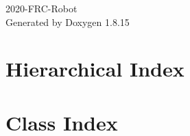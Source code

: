 \let\mypdfximage\pdfximage\def\pdfximage{\immediate\mypdfximage}\documentclass[twoside]{book}
\newcommand{\+}{\discretionary{\mbox{\scriptsize$\hookleftarrow$}}{}{}}
\newcommand{\clearemptydoublepage}{%
  \newpage{\pagestyle{empty}\cleardoublepage}%
}
\begin{document}
\hypersetup{pageanchor=false,
             bookmarksnumbered=true,
             pdfencoding=unicode
            }
\begin{titlepage}
\vspace*{7cm}
\begin{center}%
{\Large 2020-\/F\+R\+C-\/\+Robot }\\
\vspace*{1cm}
{\large Generated by Doxygen 1.8.15}\\
\end{center}
\end{titlepage}
\clearemptydoublepage
{}
\tableofcontents
\clearemptydoublepage
{}
\hypersetup{pageanchor=true}

\chapter{Hierarchical Index}

\chapter{Class Index}

\end{document}

